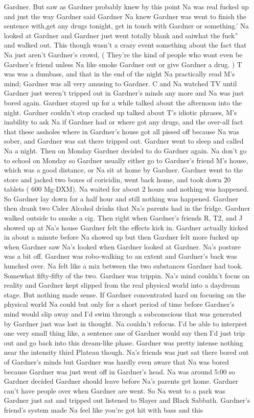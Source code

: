 \documentclass[12pt]{book}
\begin{document}
Gardner. But saw as Gardner probably knew by this point Na was real fucked up and just the way Gardner said Gardner Na knew Gardner was went to finish the sentence with,get any drugs tonight, get in touch with Gardner or something.' Na looked at Gardner and Gardner just went totally blank and saiwhat the fuck'' and walked out. This though wasn't a crazy event something about the fact that Na just aren't Gardner's crowd, ( They're the kind of people who wont even be Gardner's friend unless Na like smoke Gardner out or give Gardner a drug. ) T was was a dumbass, and that in the end of the night Na practically read M's mind; Gardner was all very amusing to Gardner. C and Na watched TV until Gardner just weren't tripped out in Gardner's minds any more and Na was just bored again. Gardner stayed up for a while talked about the afternoon into the night. Gardner couldn't stop cracked up talked about T's idiotic phrases, M's inability to ask Na if Gardner had or where got any drugs, and the over-all fact that these assholes where in Gardner's house got all pissed off because Na was sober, and Gardner was sat there tripped out. Gardner went to sleep and called Na a night. Then on Monday Gardner decided to do Gardner again. Na don't go to school on Monday so Gardner usually either go to Gardner's friend M's house, which was a good distance, or Na sit at home by Gardner. Gardner went to the store and jacked two boxes of coricidin, went back home, and took down 20 tablets ( 600 Mg-DXM). Na waited for about 2 hours and nothing was happened. So Gardner lay down for a half hour and still nothing was happened. Gardner then drank two Cider Alcohol drinks that Na's parents had in the fridge. Gardner walked outside to smoke a cig. Then right when Gardner's friends R, T2, and J showed up at Na's house Gardner felt the effects kick in. Gardner actually kicked in about a minute before Na showed up but then Gardner felt more fucked up when Gardner saw Na's looked when Gardner looked at Gardner. Na's posture was a bit off. Gardner was robo-walking to an extent and Gardner's back was hunched over. Na felt like a mix between the two substances Gardner had took. Somewhat fifty-fifty of the two. Gardner was trippin. Na's mind couldn't focus on reality and Gardner kept slipped from the real physical world into a daydream stage. But nothing made sense. If Gardner concentrated hard on focusing on the physical world Na could but only for a short period of time before Gardner's mind would slip away and I'd swim through a subconscious that was generated by Gardner just was lost in thought. Na couldn't refocus. I'd be able to interpret one very small thing like, a sentence one of Gardner would say then I'd just trip out and go back into this dream-like phase. Gardner was pretty intense nothing near the intensity third Plateau though. Na's friends was just sat there bored out of Gardner's minds but Gardner was hardly even aware that Na was bored because Gardner was just went off in Gardner's head. Na was around 5:00 so Gardner decided Gardner should leave before Na's parents get home. Gardner can't have people over when Gardner are went. So Na went to a park was Gardner just sat and tripped out listened to Slayer and Black Sabbath. Gardner's friend's system made Na feel like you're got hit with bass and this 
\end{document}
